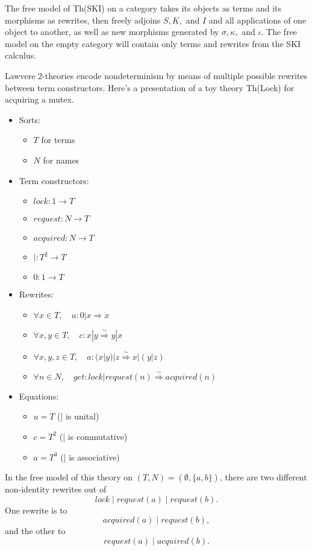 \documentclass{article}
\newcommand{\maps}{\colon}
\begin{document}
The free model of Th(SKI) on a category takes its objects as terms and its morphisms as rewrites, then freely adjoins $S,K,$ and $I$ and all applications of one object to another, as well as new morphisms generated by $\sigma,\kappa,$ and $\iota.$  The free model on the empty category will contain only terms and rewrites from the SKI calculus.

Lawvere 2-theories encode nondeterminism by means of multiple possible rewrites between term constructors.  Here's a presentation of a toy theory Th(Lock) for acquiring a mutex.
\begin{center}
  \begin{itemize}
    \item Sorts:
    \begin{itemize}
      \item $T$ for terms
      \item $N$ for names
    \end{itemize}
    \item Term constructors:
    \begin{itemize}
      \item $lock\maps 1 \to T$
      \item $request\maps N \to T$
      \item $acquired\maps N \to T$
      \item $|\maps T^2 \to T$
      \item $0 \maps 1 \to T$
    \end{itemize}
    \item Rewrites:
    \begin{itemize}
      \item $\forall x \in T, \quad u\maps 0|x \Rightarrow x$
      \item $\forall x,y \in T,\quad c\maps x|y \stackrel{\sim}{\Rightarrow} y|x$
      \item $\forall x,y,z \in T,\quad a\maps (x|y)|z \stackrel{\sim}{\Rightarrow} x|(y|z)$
      \item $\forall n \in N,\quad get\maps lock | request(n) \stackrel{\sim}{\Rightarrow} acquired(n)$
    \end{itemize}
    \item Equations:
    \begin{itemize}
      \item $u = T$ (| is unital)
      \item $c = T^2$ (| is commutative)
      \item $a = T^3$ (| is associative)
    \end{itemize}
  \end{itemize}
\end{center}
In the free model of this theory on $(T, N) = (\emptyset, \{ a,b\})$, there are two different non-identity rewrites out of
\[ lock \;|\; request(a) \;|\; request(b). \]
One rewrite is to
\[ acquired(a) \;|\; request(b), \]
and the other to
\[ request(a) \;|\; acquired(b). \]
\end{document}
